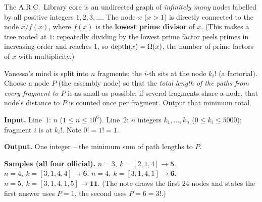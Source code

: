 \begin{problemstatement}
The A.R.C.\ Library core is an undirected graph of \emph{infinitely many} nodes labelled by
all positive integers \(1,2,3,\dots\). The node \(x\) (\(x>1\)) is directly connected to the
node \(x/f(x)\), where \(f(x)\) is the \textbf{lowest prime divisor} of \(x\). (This makes a
tree rooted at \(1\): repeatedly dividing by the lowest prime factor peels primes in
increasing order and reaches \(1\), so \(\operatorname{depth}(x)=\Omega(x)\), the number of prime factors of
\(x\) with multiplicity.)

Vanessa's mind is split into \(n\) fragments; the \(i\)-th sits at the node \(k_i!\) (a
factorial). Choose a node \(P\) (the assembly node) so that the \emph{total length of the
paths from every fragment to \(P\)} is as small as possible; if several fragments share a
node, that node's distance to \(P\) is counted once per fragment. Output that minimum total.

\textbf{Input.} Line~1: \(n\) (\(1\le n\le 10^6\)). Line~2: \(n\) integers \(k_1,\dots,k_n\)
(\(0\le k_i\le 5000\)); fragment \(i\) is at \(k_i!\). Note \(0!=1!=1\).

\textbf{Output.} One integer -- the minimum sum of path lengths to \(P\).

\textbf{Samples (all four official).} \(n{=}3,\ k{=}[2,1,4]\to \mathbf{5}\).
\(n{=}4,\ k{=}[3,1,4,4]\to\mathbf{6}\). \(n{=}4,\ k{=}[3,1,4,1]\to\mathbf{6}\).
\(n{=}5,\ k{=}[3,1,4,1,5]\to\mathbf{11}\). (The note draws the first \(24\) nodes and states
the first answer uses \(P=1\), the second uses \(P=6=3!\).)
\end{problemstatement}

